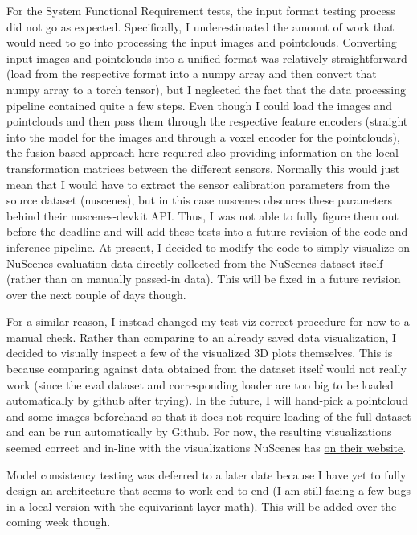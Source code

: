 \documentclass[12pt, titlepage]{article}
\begin{document}
For the System Functional Requirement tests, the input format testing process did not go as expected.
Specifically, I underestimated the amount of work that would need to go into processing the input images and pointclouds.
Converting input images and pointclouds into a unified format was relatively straightforward (load from the respective format into a numpy array and then convert that numpy array to a torch tensor), 
but I neglected the fact that the data processing pipeline contained quite a few steps. Even though I could load the images and pointclouds and then pass them through the respective feature encoders 
(straight into the model for the images and through a voxel encoder for the pointclouds), the fusion based approach here required also providing information on the local transformation matrices between 
the different sensors. Normally this would just mean that I would have to extract the sensor calibration parameters from the source dataset (nuscenes), but in this case nuscenes obscures these parameters 
behind their nuscenes-devkit API. Thus, I was not able to fully figure them out before the deadline and will add these tests into a future revision of the code and inference pipeline. At present, I decided to 
modify the code to simply visualize on NuScenes evaluation data directly collected from the NuScenes dataset itself (rather than on manually passed-in data). This will be fixed in a future revision over the next couple of days though.

For a similar reason, I instead changed my test-viz-correct procedure for now to a manual check. Rather than comparing to an already saved data visualization, I decided to visually inspect a few of the visualized 3D plots themselves. 
This is because comparing against data obtained from the dataset itself would not really work (since the eval dataset and corresponding loader are too big to be loaded automatically by github after trying). In the future, I will hand-pick a pointcloud and some 
images beforehand so that it does not require loading of the full dataset and can be run automatically by Github. For now, the resulting visualizations seemed correct and in-line with the visualizations NuScenes has \href{https://www.nuscenes.org/nuscenes}{on their website}.

Model consistency testing was deferred to a later date because I have yet to fully design an architecture that seems to work end-to-end (I am still facing a few bugs in a local version with the equivariant layer math). This will be added over the coming week though.
\end{document}
